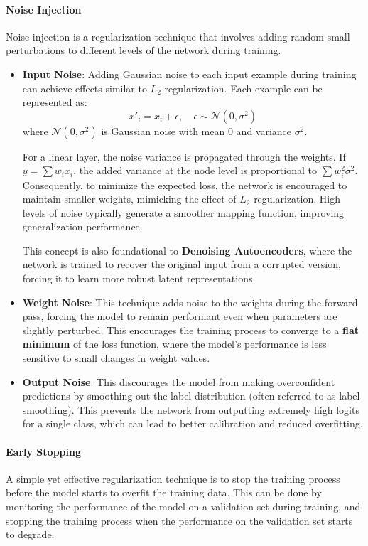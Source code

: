 \paragraph{Noise Injection}
Noise injection is a regularization technique that involves adding random small perturbations to different 
levels of the network during training.
\begin{itemize}
    \item \textbf{Input Noise}: Adding Gaussian noise to each input example during training can achieve effects similar to $L_2$ regularization. 
    Each example can be represented as:
    \[ x'_i = x_i + \epsilon, \quad \epsilon \sim \mathcal{N}(0, \sigma^2) \]
    where $\mathcal{N}(0, \sigma^2)$ is Gaussian noise with mean 0 and variance $\sigma^2$. 

    For a linear layer, the noise variance is propagated through the weights. 
    If $y = \sum w_i x_i$, the added variance at the node level is proportional to $\sum w_i^2 \sigma^2$. 
    Consequently, to minimize the expected loss, the network is encouraged to maintain smaller weights, mimicking the effect of $L_2$ regularization. 
    High levels of noise typically generate a smoother mapping function, improving generalization performance.

    This concept is also foundational to \textbf{Denoising Autoencoders}, where the network is trained to recover the original input 
    from a corrupted version, forcing it to learn more robust latent representations.

    \item \textbf{Weight Noise}: This technique adds noise to the weights during the forward pass, 
    forcing the model to remain performant even when parameters are slightly perturbed. 
    This encourages the training process to converge to a \textbf{flat minimum} of the loss function, 
    where the model's performance is less sensitive to small changes in weight values.

    \item \textbf{Output Noise}: This discourages the model from making overconfident predictions by smoothing out the label distribution (often referred to as label smoothing). 
    This prevents the network from outputting extremely high logits for a single class, which can lead to better calibration and reduced overfitting.
\end{itemize}

\paragraph{Early Stopping}
A simple yet effective regularization technique is to stop the training process before the model starts to overfit the training data.
This can be done by monitoring the performance of the model on a validation set during training, and stopping the training process when the 
performance on the validation set starts to degrade.

